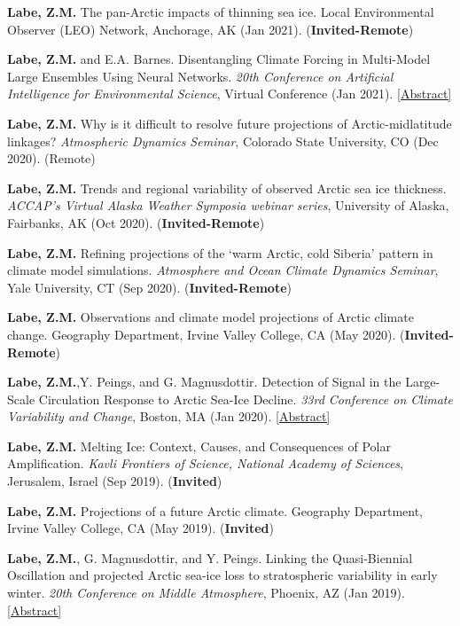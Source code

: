 \documentclass[margin,line,palatino,courier,10pt]{res}
\begin{document}
\begin{resume}
\begin{etaremune}[leftmargin=0in,topsep=0in,parsep=0in]
\item \textbf{Labe, Z.M.} The pan-Arctic impacts of thinning sea ice. Local Environmental Observer (LEO) Network, Anchorage, AK (Jan 2021). (\textbf{Invited-Remote})
\item \textbf{Labe, Z.M.} and E.A. Barnes. Disentangling Climate Forcing in Multi-Model Large Ensembles Using Neural Networks. \textit{20th Conference on Artificial Intelligence for Environmental Science}, Virtual Conference (Jan 2021). \href{https://ams.confex.com/ams/101ANNUAL/meetingapp.cgi/Paper/379553}{[Abstract]}
\item \textbf{Labe, Z.M.} Why is it difficult to resolve future projections of Arctic-midlatitude linkages? \textit{Atmospheric Dynamics Seminar}, Colorado State University, CO (Dec 2020). (Remote)
\item \textbf{Labe, Z.M.} Trends and regional variability of observed Arctic sea ice thickness. \textit{ACCAP’s Virtual Alaska Weather Symposia webinar series}, University of Alaska, Fairbanks, AK (Oct 2020). (\textbf{Invited-Remote})
\item \textbf{Labe, Z.M.} Refining projections of the `warm Arctic, cold Siberia' pattern in climate model simulations. \textit{Atmosphere and Ocean Climate Dynamics Seminar}, Yale University, CT (Sep 2020). (\textbf{Invited-Remote})
\item \textbf{Labe, Z.M.} Observations and climate model projections of Arctic climate change. Geography Department, Irvine Valley College, CA (May 2020). (\textbf{Invited-Remote})
\item \textbf{Labe, Z.M.},Y. Peings, and G. Magnusdottir. Detection of Signal in the Large-Scale Circulation Response to Arctic Sea-Ice Decline. \textit{33rd Conference on Climate Variability and Change}, Boston, MA (Jan 2020). \href{https://ams.confex.com/ams/2020Annual/meetingapp.cgi/Paper/367289}{[Abstract]}
\item \textbf{Labe, Z.M.} Melting Ice: Context, Causes, and Consequences of Polar Amplification. \textit{Kavli Frontiers of Science, National Academy of Sciences}, Jerusalem, Israel (Sep 2019). (\textbf{Invited}) 
\item \textbf{Labe, Z.M.} Projections of a future Arctic climate. Geography Department, Irvine Valley College, CA (May 2019). (\textbf{Invited})
\item \textbf{Labe, Z.M.}, G. Magnusdottir, and Y. Peings. Linking the Quasi-Biennial Oscillation and projected Arctic sea-ice loss to stratospheric variability in early winter. \textit{20th Conference on Middle Atmosphere}, Phoenix, AZ (Jan 2019). \href{https://ams.confex.com/ams/2019Annual/meetingapp.cgi/Paper/352664}{[Abstract]}

\end{etaremune}
\end{resume}
\end{document}
